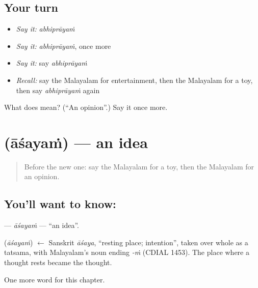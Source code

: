 \subsection*{Your turn}
\begin{itemize}
\raggedright
  \item \emph{Say it:} \emph{abhiprāyaṁ}
  \item \emph{Say it:} \emph{abhiprāyaṁ}, once more
  \item \emph{Say it:} say \emph{abhiprāyaṁ}
  \item \emph{Recall:} say the Malayalam for entertainment, then the Malayalam for a toy, then say \emph{abhiprāyaṁ} again
\end{itemize}

\begin{tcolorbox}[breakable,colback=teal!4,colframe=teal!35!black,title={Before you move on}]
What does  mean? (\textquotedblleft{}An opinion\textquotedblright{}.) Say it once more.
\end{tcolorbox}
\section[\texorpdfstring{\ml{ആശയം} (āśayaṁ)}{ആശയം (āśayaṁ)}]{ (āśayaṁ) — an idea}

\label{lesson:ML-C256-asayam}



\begin{quote}
Before the new one: say the Malayalam for a toy, then the Malayalam for an opinion.
\end{quote}

\subsection*{You'll want to know: }
\textbf{} — \emph{āśayaṁ} — \textquotedblleft{}an idea\textquotedblright{}.

\begin{cousinweb}
\textbf{} (\emph{āśayaṁ}) $\leftarrow$ Sanskrit \emph{āśaya}, \textquotedblleft{}resting place; intention\textquotedblright{}, taken over whole as a tatsama, with Malayalam's noun ending \emph{-ṁ} (CDIAL 1453). The place where a thought rests became the thought.
\end{cousinweb}

\begin{grammarlens}[title={What you've built}]
One more word for this chapter.
\end{grammarlens}

